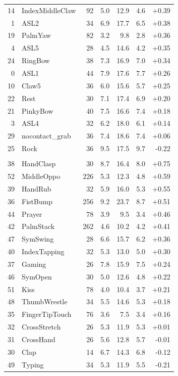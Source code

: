 \begin{table}[h]
\begin{tabular}{rlrrrrr}
14 & IndexMiddleClaw         & 92  & 5.0 & 12.9 & 4.6 & +0.39 \\
1  & ASL2                    & 34  & 6.9 & 17.7 & 6.5 & +0.38 \\
19 & PalmYaw                 & 82  & 3.2 & 9.8  & 2.8 & +0.36 \\
4  & ASL5                    & 28  & 4.5 & 14.6 & 4.2 & +0.35 \\
24 & RingBow                 & 38  & 7.3 & 16.9 & 7.0 & +0.34 \\
0  & ASL1                    & 44  & 7.9 & 17.6 & 7.7 & +0.26 \\
10 & Claw5                   & 36  & 6.0 & 15.6 & 5.7 & +0.25 \\
22 & Rest                    & 30  & 7.1 & 17.4 & 6.9 & +0.20 \\
21 & PinkyBow                & 40  & 7.5 & 16.6 & 7.4 & +0.18 \\
3  & ASL4                    & 32  & 6.2 & 18.0 & 6.1 & +0.14 \\
29 & nocontact\_grab          & 36  & 7.4 & 18.6 & 7.4 & +0.06 \\
25 & Rock                    & 36  & 9.5 & 17.5 & 9.7 & -0.22 \\

\addlinespace[3pt]
\multicolumn{7}{l}{\textit{Symmetric bimanual gestures}} \\
38 & HandClasp       & 30  & 8.7 & 16.4 & 8.0 & +0.75 \\
52 & MiddleOppo      & 226 & 5.3 & 12.3 & 4.8 & +0.59 \\
39 & HandRub         & 32  & 5.9 & 16.0 & 5.3 & +0.55 \\
36 & FistBump        & 256 & 9.2 & 23.7 & 8.7 & +0.51 \\
44 & Prayer          & 78  & 3.9 & 9.5  & 3.4 & +0.46 \\
42 & PalmStack       & 262 & 4.6 & 10.2 & 4.2 & +0.41 \\
47 & SymSwing        & 28  & 6.6 & 15.7 & 6.2 & +0.36 \\
40 & IndexTapping    & 32  & 5.3 & 13.0 & 5.0 & +0.30 \\
37 & Gaming          & 26  & 7.8 & 15.9 & 7.5 & +0.24 \\
46 & SymOpen         & 30  & 5.0 & 12.6 & 4.8 & +0.22 \\
51 & Kiss            & 78  & 4.0 & 10.4 & 3.7 & +0.21 \\
48 & ThumbWrestle    & 34  & 5.5 & 14.6 & 5.3 & +0.18 \\
35 & FingerTipTouch  & 76  & 3.6 & 7.5  & 3.4 & +0.16 \\
32 & CrossStretch    & 26  & 5.3 & 11.9 & 5.3 & +0.01 \\
31 & CrossHand       & 26  & 5.6 & 12.8 & 5.7 & -0.01 \\
30 & Clap            & 14  & 6.7 & 14.3 & 6.8 & -0.12 \\
49 & Typing          & 34  & 5.3 & 11.9 & 5.5 & -0.21 \\


\end{tabular}
\end{table}

